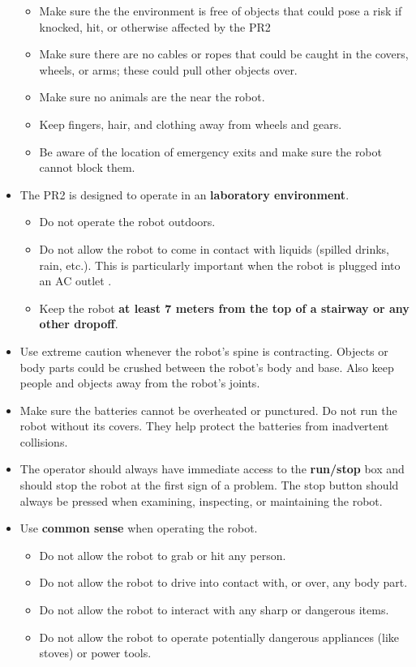 \begin{itemize}
\begin{itemize}
\item Make sure the the environment is free of objects that could pose a risk if knocked, hit, or otherwise affected by the PR2
\item Make sure there are no cables or ropes that could be caught in the covers, wheels, or arms; these could pull other objects over.
\item Make sure no animals are the near the robot.
\item Keep fingers, hair, and clothing away from wheels and gears.
\item Be aware of the location of emergency exits and make sure the robot cannot block them.
\end{itemize}
\item The PR2 is designed to operate in an {\bf laboratory environment}.
\begin{itemize}
\item Do not operate the robot outdoors.
\item Do not allow the robot to come in contact with liquids (spilled drinks, rain, etc.). This is particularly important when the robot is plugged into an AC outlet .
\item Keep the robot {\bf at least 7 meters from the top of a stairway or any other dropoff}.
\end{itemize}
\item Use extreme caution whenever the robot's spine is contracting. Objects or body parts could be crushed between the robot's body and base. Also keep people and objects away from the robot's joints.
\item Make sure the batteries cannot be overheated or punctured.  Do not run the robot without its covers. They help protect the batteries from inadvertent collisions.
\item The operator should always have immediate access to the {\bf run/stop} box and should stop the robot at the first sign of a problem. The stop button should always be pressed when examining, inspecting, or maintaining the robot.
\item Use {\bf common sense} when operating the robot.
\begin{itemize}
\item Do not allow the robot to grab or hit any person.
\item Do not allow the robot to drive into contact with, or over, any body part.
\item Do not allow the robot to interact with any sharp or dangerous items.
\item Do not allow the robot to operate potentially dangerous appliances (like stoves) or power tools.

\end{itemize}
\end{itemize}
